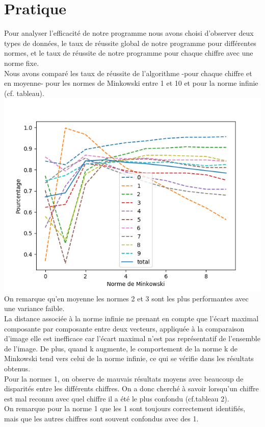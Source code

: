 \documentclass[a4paper,11pt,twoside]{report}
\begin{document}
\section{Pratique}
Pour analyser l'efficacité de notre programme nous avons choisi d'observer deux types de données, le taux de réussite global de notre programme pour différentes normes, et le taux de réussite de notre programme pour chaque chiffre avec une norme fixe.\\
Nous avons comparé les taux de réussite de l'algorithme -pour chaque chiffre et en moyenne- pour les normes de Minkowski entre 1 et 10 et pour la norme infinie (cf. tableau).\\
\includegraphics[scale=0.75]{Graphs/normsminky.png} \\
On remarque qu'en moyenne les normes 2 et 3 sont les plus performantes avec une variance faible. \\
La distance associée à la norme infinie ne prenant en compte que l'écart maximal composante par composante entre deux vecteurs, appliquée à la comparaison d'image elle est inefficace car l'écart maximal n'est pas représentatif de l'ensemble de l'image. De plus, quand k augmente, le comportement de la norme k de Minkowski tend vers celui de la norme infinie, ce qui se vérifie dans les résultats obtenus.\\ 
Pour la normes 1, on observe de mauvais résultats moyens avec beaucoup de disparités entre les différents chiffres. On a donc cherché à savoir lorsqu'un chiffre est mal reconnu avec quel chiffre il a été le plus confondu (cf.tableau 2).\\
On remarque pour la norme 1 que les 1 sont toujours correctement identifiés, mais que les autres chiffres sont souvent confondus avec des 1. 
\end{document}
